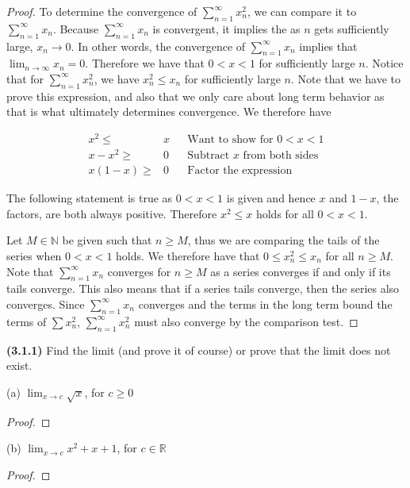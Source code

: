 \documentclass[12pt]{article}
\newcommand{\limit}[1]{\displaystyle \lim_{ {#1} }}
\newcommand{\limtoinf}[1][n]{\displaystyle\lim_{ {#1} \to \infty}}
\newcommand{\series}[2]{\displaystyle \sum_{ {#1} }^{ {#2} }}
\newcommand{\bR}{\mathbb{R}}
\newcommand{\bN}{\mathbb{N}}
\begin{document}
\begin{proof}
	To determine the convergence of $\series{n=1}{\infty} x_n^2$, we can compare it to $\series{n=1}{\infty}x_n$. Because  $\series{n=1}{\infty}x_n$ is convergent, it implies the as $n$ gets sufficiently large, $x_n\to0$. In other words, the convergence of  $\series{n=1}{\infty}x_n$ implies that $\limtoinf x_n=0$. Therefore we have that $0<x<1$ for sufficiently large $n$. Notice that for $\series{n=1}{\infty} x_n^2$, we have $x_n^2\le x_n$ for sufficiently large $n$. Note that we have to prove this expression, and also that we only care about long term behavior as that is what ultimately determines convergence. We therefore have
	
\begin{align*}
	x^2\le&x&&\text{Want to show for }0<x<1 \\
	x - x^2\ge&0&&\text{Subtract }x\text{ from both sides} \\
	x(1-x)\ge&0&&\text{Factor the expression}
\end{align*} 

The following statement is true as $0<x<1$ is given and hence $x$ and $1-x$, the factors, are both always positive. Therefore $x^2\le x$ holds for all $0<x<1$.

Let $M\in\bN$ be given such that $n\ge M$, thus we are comparing the tails of the series when $0<x<1$ holds. We therefore have that $0\le x_n^2\le x_n$ for all $n\ge M$. Note that $\series{n=1}{\infty}x_n$ converges for $n\ge M$ as a series converges if and only if its tails converge. This also means that if a series tails converge, then the series also converges. Since $\series{n=1}{\infty}x_n$ converges and the terms in the long term bound the terms of $\sum x_n^2$, $\series{n=1}{\infty} x_n^2$  must also converge by the comparison test.
\end{proof}

\newpage

\noindent \textbf{(3.1.1)} Find the limit (and prove it of course) or prove that the limit does not exist.

\noindent (a) $\limit{x\to c} \sqrt{x}$, for $c\ge0$

\begin{proof}
	\lipsum[1][1-5]
\end{proof}

\noindent (b) $\limit{x\to c}x^2 + x + 1$, for $c\in\bR$

\begin{proof}
	\lipsum[1][1-5]
\end{proof}
\end{document}
